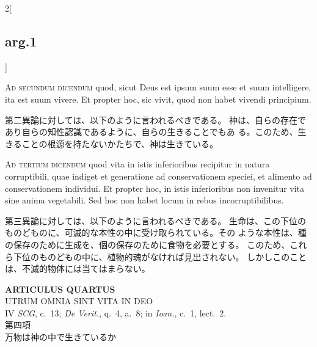 \documentclass[paper=a4paper,fontsize=10pt,jafontsize=9pt,titlepage]{jlreq}
\begin{document}
\begin{paracol}{2}[\subsection{arg.1}]
\switchcolumn*[\subsection{ad.2}]


{\scshape Ad secundum dicendum} quod, sicut Deus est ipsum suum esse et
suum intelligere, ita est suum vivere. Et propter hoc, sic vivit, quod
non habet vivendi principium.

\switchcolumn

第二異論に対しては、以下のように言われるべきである。
神は、自らの存在であり自らの知性認識であるように、自らの生きることでもあ
 る。このため、生きることの根源を持たないかたちで、神は生きている。

\switchcolumn*[\subsection{ad.3}]


{\scshape Ad tertium dicendum} quod vita in istis inferioribus recipitur
in natura corruptibili, quae indiget et generatione ad conservationem
speciei, et alimento ad conservationem individui. Et propter hoc, in
istis inferioribus non invenitur vita sine anima vegetabili. Sed hoc non
habet locum in rebus incorruptibilibus.

\switchcolumn

第三異論に対しては、以下のように言われるべきである。
生命は、この下位のものどものに、可滅的な本性の中に受け取られている。その
 ような本性は、種の保存のために生成を、個の保存のために食物を必要とする。
 このため、これら下位のものどもの中に、植物的魂がなければ見出されない。
 しかしこのことは、不滅的物体には当てはまらない。

\end{paracol}
\newpage






{}
\setcounter{section}{4}
\setcounter{subsection}{0}
\begin{center}
 {\Large {\bfseries ARTICULUS QUARTUS}}\\
 {\large UTRUM OMNIA SINT VITA IN DEO}\\
 {\footnotesize IV {\itshape SCG}, c.~13; {\itshape De Verit.}, q.~4,
 a.~8; in {\itshape Ioan.}, c.~1, lect.~2.}\\
 {\Large 第四項\\万物は神の中で生きているか}
\end{center}
\end{document}
